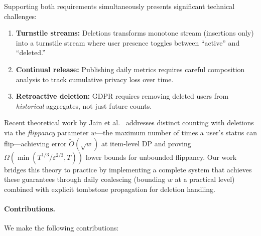 \documentclass[sigconf,anonymous,review]{acmart}
\begin{document}
Supporting both requirements simultaneously presents significant technical challenges:

\begin{enumerate}
    \item \textbf{Turnstile streams:} Deletions transforms monotone stream (insertions only) into a turnstile stream where user presence toggles between ``active'' and ``deleted.''

    \item \textbf{Continual release:} Publishing daily metrics requires careful composition analysis to track cumulative privacy loss over time.

    \item \textbf{Retroactive deletion:} GDPR requires removing deleted users from \emph{historical} aggregates, not just future counts.
\end{enumerate}

Recent theoretical work by Jain et al.~\cite{Flippancy2023} addresses distinct counting with deletions via the \emph{flippancy} parameter $w$---the maximum number of times a user's status can flip---achieving error $\tilde{O}(\sqrt{w})$ at item-level DP and proving $\Omega(\min(T^{1/3}/\varepsilon^{2/3}, T))$ lower bounds for unbounded flippancy. Our work bridges this theory to practice by implementing a complete system that achieves these guarantees through daily coalescing (bounding $w$ at a practical level) combined with explicit tombstone propagation for deletion handling.

\paragraph{Contributions.} We make the following contributions:
\end{document}
